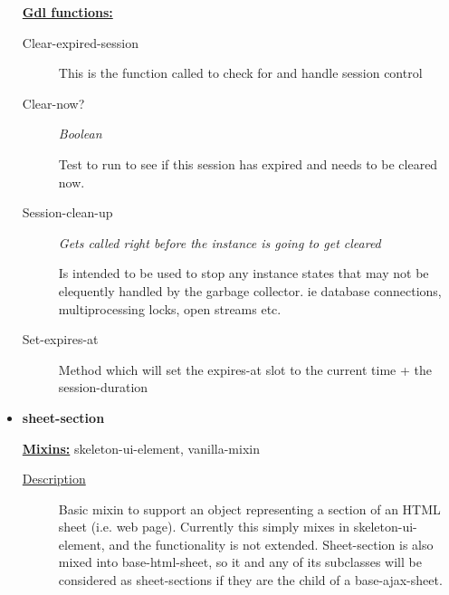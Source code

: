 \documentclass [11pt]{book}
\begin{document}
\begin{itemize}
\textbf{
\underline{Gdl functions:}}

\begin{description}

\item [Clear-expired-session]

This is the function called to check for and handle session control




\item [Clear-now?]
\emph{Boolean}

 Test to run to see if this session has expired and needs to be cleared now.




\item [Session-clean-up]
\emph{Gets called right before the instance is going to get cleared}

 Is intended to be used to stop any instance states that may not be elequently handled by the garbage collector. ie database connections, multiprocessing locks, open streams etc.




\item [Set-expires-at]

Method which will set the expires-at slot to the current time + the session-duration




\end{description}







\item {}
\label{prim:sheet-section}
\textbf{sheet-section}


\textbf{
\underline{Mixins:}} skeleton-ui-element, vanilla-mixin





\begin{description}

\item [
\underline{Description}]


Basic mixin to support an object 
representing a section of an HTML sheet (i.e. web page). Currently 
this simply mixes in skeleton-ui-element, and the functionality is not 
extended. Sheet-section is also mixed into base-html-sheet, so it and 
any of its subclasses will be considered as sheet-sections if they 
are the child of a base-ajax-sheet.






\end{description}
\end{itemize}
\end{document}
